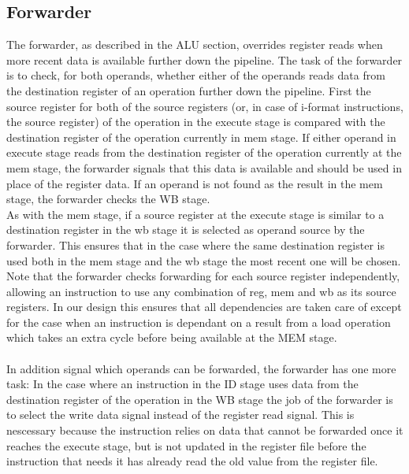 \subsection{Forwarder}
\label{section:Forwarder}
The forwarder, as described in the ALU section, overrides register reads when more recent data is available further down the pipeline.
The task of the forwarder is to check, for both operands, whether either of the operands reads data from the destination register of an operation further down the pipeline.
First the source register for both of the source registers (or, in case of i-format instructions, the source register) of the operation in the execute stage is compared with the destination register of the operation currently in mem stage. 
If either operand in execute stage reads from the destination register of the operation currently at the mem stage, the forwarder signals that this data is available and should be used in place of the register data.
If an operand is not found as the result in the mem stage, the forwarder checks the WB stage.\\
As with the mem stage, if a source register at the execute stage is similar to a destination register in the wb stage it is selected as operand source by the forwarder. 
This ensures that in the case where the same destination register is used both in the mem stage and the wb stage the most recent one will be chosen.
Note that the forwarder checks forwarding for each source register independently, allowing an instruction to use any combination of reg, mem and wb as its source registers.
In our design this ensures that all dependencies are taken care of except for the case when an instruction is dependant on a result from a load operation which takes an extra cycle before being available at the MEM stage.\\ \\
In addition signal which operands can be forwarded, the forwarder has one more task:
In the case where an instruction in the ID stage uses data from the destination register of the operation in the WB stage the job of the forwarder is to select the write data signal instead of the register read signal.
This is nescessary because the instruction relies on data that cannot be forwarded once it reaches the execute stage, but is not updated in the register file before the instruction that needs it has already read the old value from the register file.

